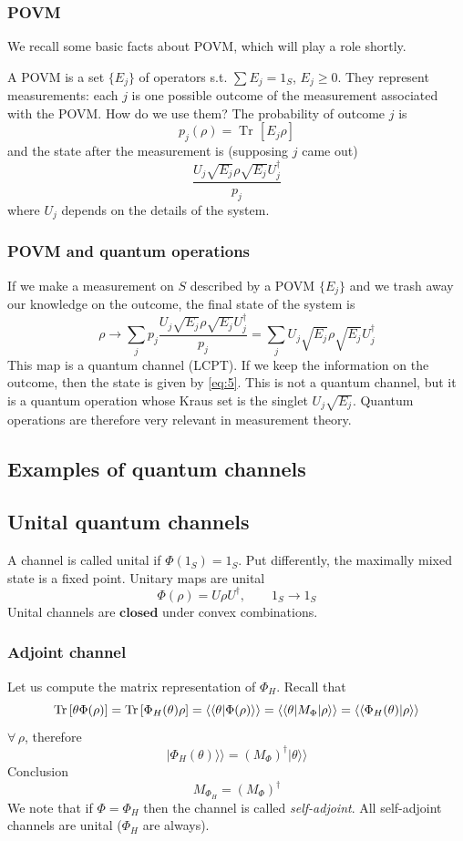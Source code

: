 \documentclass[a4paper, 11pt]{article}
\newcommand{\Tr}{\mathop{\mathrm{Tr}\!}{}}
\newcommand\kett[1]{{|{#1}\rangle\rangle}}
\begin{document}
	\subsubsection{POVM}
	We recall some basic facts about POVM, which will play a role shortly.
	
	A POVM is a set $\{E_j\}$ of operators s.t. $\sum E_j = 1_S$, $E_j\ge 0$. They represent measurements: each $j$ is one possible outcome of the measurement associated with the POVM. How do we use them?
	The probability of outcome $j$ is
	\[ p_j(\rho) = \Tr\left[ E_j \rho \right] \]
	and the state after the measurement is (supposing $j$ came out)
	\begin{equation}
	\label{eq:5}
	\dfrac{U_j \sqrt{E_j} \rho \sqrt{E_j} U_j^\dagger}{p_j}
	\end{equation}
	where $U_j$ depends on the details of the system.
	
	\subsubsection{POVM and quantum operations}
	If we make a measurement on $S$ described by a POVM $\{E_j\}$ and we trash away our knowledge on the outcome, the final state of the system is
	\[ \rho\rightarrow \sum_j p_j \dfrac{U_j \sqrt{E_j} \rho \sqrt{E_j} U_j^\dagger}{p_j} = \sum_j U_j \sqrt{E_j} \rho \sqrt{E_j} U_j^\dagger \]
	This map is a quantum channel (LCPT). If we keep the information on the outcome, then the state is given by \ref{eq:5}. This is not a quantum channel, but it is a quantum operation whose Kraus set is the singlet $U_j\sqrt{E_j}$. Quantum operations are therefore very relevant in measurement theory.
	
	\subsection{Examples of quantum channels}
	\subsection{Unital quantum channels}
	A channel is called unital if $\Phi(1_S) = 1_S$. Put differently, the maximally mixed state is a fixed point. Unitary maps are unital
	\[ \Phi(\rho) = U\rho U^\dagger,\qquad 1_S \rightarrow 1_S \]
	Unital channels are $\mathbf{closed}$ under convex combinations.
	
	\subsubsection{Adjoint channel}
	Let us compute the matrix representation of $\Phi_H$. Recall that
	\[ \Tr\left[\theta \Phi(\rho)\right] = \Tr\left[ \Phi_H(\theta) \rho \right] = \langle\braket{\theta|\Phi(\rho)}\rangle = \langle \braket{\theta|M_\Phi|\rho}\rangle = \langle\braket{\Phi_H(\theta)|\rho}\rangle \]
	$\forall\,\rho$, therefore
	\[ \kett{\Phi_H(\theta)} = (M_\Phi)^\dagger \kett{\theta} \]
	Conclusion
	\[ M_{\Phi_H} = (M_\Phi)^\dagger \]
	We note that if $\Phi=\Phi_H$ then the channel is called \emph{self-adjoint}. All self-adjoint channels are unital ($\Phi_H$ are always).
	
\end{document}
